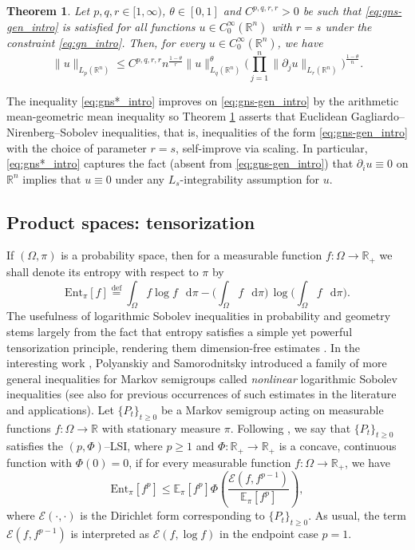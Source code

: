 \documentclass[a4paper,twoside,11pt,reqno]{amsart}
\newcommand{\eqdef}{\stackrel{\mathrm{def}}{=}}
\newtheorem{theorem}{Theorem}
\newcommand*\diff{\mathop{}\!\mathrm{d}}
\newcommand{\R}{\mathbb{R}} %
\newcommand{\mb}{\mathbb}
\newcommand{\ms}{\mathscr}
\newcommand{\mr}{\mathrm}
\begin{document}
\begin{theorem} \label{thm:gns_intro}
Let $p,q,r\in[1,\infty)$, $\theta\in[0,1]$ and $C^{p,q,r,r}>0$ be such that \eqref{eq:gns-gen_intro} is satisfied for all functions $u\in C_0^\infty(\R^n)$ with $r=s$ under the constraint \eqref{eq:gn_intro}. Then, for every $u\in C_0^\infty(\R^n)$, we have
\begin{equation} \label{eq:gns*_intro}
\|u\|_{L_p(\R^n)} \leq C^{p,q,r,r} n^{\frac{1-\theta}{r}} \|u\|_{L_q(\R^n)}^\theta \Big( \prod_{j=1}^n \|\partial_ju\|_{L_r(\R^n)}\Big)^{\frac{1-\theta}{n}}.
\end{equation}
\end{theorem}
The inequality \eqref{eq:gns*_intro} improves on \eqref{eq:gns-gen_intro} by the arithmetic mean-geometric mean inequality so Theorem \ref{thm:gns_intro} asserts that Euclidean Gagliardo--Nirenberg--Sobolev inequalities, that is, inequalities of the form \eqref{eq:gns-gen_intro} with the choice of parameter $r=s$, self-improve via scaling. In particular, \eqref{eq:gns*_intro} captures the fact (absent from \eqref{eq:gns-gen_intro}) that $\partial_i u \equiv 0$ on $\R^n$ implies that $u\equiv 0$ under any $L_s$-integrability assumption for $u$.

\subsection{Product spaces: tensorization} \label{sec:1.3}
If $(\Omega,\pi)$ is a probability space, then for a measurable function $f:\Omega\to\R_+$ we shall denote its entropy with respect to $\pi$ by
\begin{equation}
\mathrm{Ent}_\pi[f] \eqdef \int_\Omega f \log f\,\diff\pi - \Big( \int_\Omega f \,\diff\pi\Big) \, \log\Big( \int_\Omega f\,\diff\pi\Big).
\end{equation}The usefulness of logarithmic Sobolev inequalities in probability and geometry stems largely from the fact that entropy satisfies a simple yet powerful tensorization principle, rendering them dimension-free estimates \cite{L99}.  In the interesting work \cite{PS19},  Polyanskiy and Samorodnitsky introduced a family of more general inequalities for Markov semigroups called \emph{nonlinear} logarithmic Sobolev inequalities (see also \cite{Gro75, Wei78, CC84, DS84, Car91, Mic99,Sam08} for previous occurrences of such estimates in the literature and applications).  Let $\{P_t\}_{t\geq0}$ be a Markov semigroup acting on measurable functions $f:\Omega\to\R$  with stationary measure $\pi$. Following \cite{PS19}, we say that $\{P_t\}_{t\geq0}$ satisfies the $(p,\Phi)$--LSI, where $p\geq1$ and $\Phi:\R_+\to\R_+$ is a concave, continuous function with $\Phi(0)=0$,  if for every measurable function $f:\Omega\to\R_+$, we have
\begin{equation}
\mr{Ent}_\pi[f^p] \leq \mb{E}_\pi[f^p] \Phi\left(\frac{\ms{E}(f,f^{p-1})}{\mb{E}_\pi[f^p]}\right),
\end{equation}
where $\ms{E}(\cdot,\cdot)$ is the Dirichlet form corresponding to $\{P_t\}_{t\geq0}$. As usual, the term $\ms{E}(f,f^{p-1})$ is interpreted as $\ms{E}(f,\log f)$ in the endpoint case $p=1$.
\end{document}
